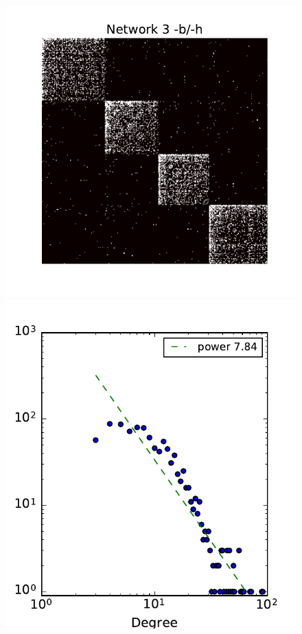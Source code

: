 \begin{figure}[h]
	\endminipage
	\vspace{-0.4cm}
	\includegraphics[scale=0.4]{img/g3}
	\endminipage
	\includegraphics[scale=0.4]{img/g3_d}

\end{figure}
